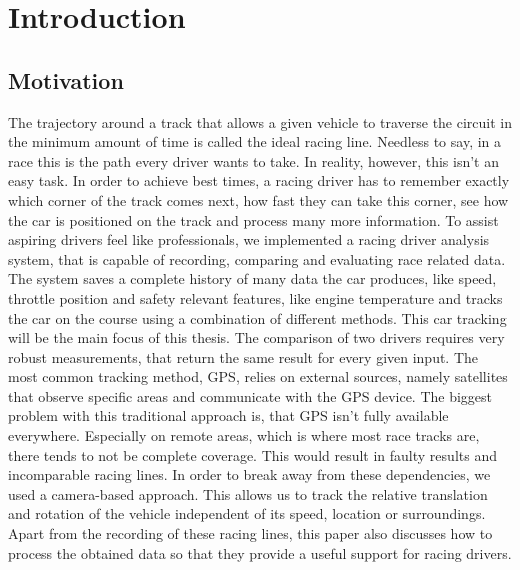 \section{Introduction}
\label{sec:intro}

\subsection{Motivation}
The trajectory around a track that allows a given vehicle to traverse the circuit in the minimum amount of time is called the ideal racing line. 
Needless to say, in a race this is the path every driver wants to take. In reality, however, this isn't an easy task. In order to achieve best times, a racing driver has to remember exactly which corner of the track comes next, how fast they can take this corner, see how the car is positioned on the track and process many more information.
To assist aspiring drivers feel like professionals, we implemented a racing driver analysis system, that is capable of recording, comparing and evaluating race related data. The system saves a complete history of many data the car produces, like speed, throttle position and safety relevant features, like engine temperature and tracks the car on the course using a combination of different methods.
This car tracking will be the main focus of this thesis. The comparison of two drivers requires very robust measurements, that return the same result for every given input.
The most common tracking method, GPS, relies on external sources, namely satellites that observe specific areas and communicate with the GPS device. The biggest problem with this traditional approach is, that GPS isn't fully available everywhere. Especially on remote areas, which is where most race tracks are, there tends to not be complete coverage. This would result in faulty results and incomparable racing lines.
In order to break away from these dependencies, we used a camera-based approach. This allows us to track the relative translation and rotation of the vehicle independent of its speed, location or surroundings.
Apart from the recording of these racing lines, this paper also discusses how to process the obtained data so that they provide a useful support for racing drivers.

